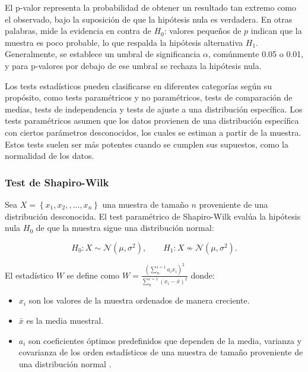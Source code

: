 El p-valor representa la probabilidad de obtener un resultado tan extremo como el observado, bajo la suposición de que la hipótesis nula es verdadera. En otras palabras, mide la evidencia en contra de $H_0$: valores pequeños de $p$ indican que la muestra es poco probable, lo que respalda la hipótesis alternativa $H_1$. Generalmente, se establece un umbral de significancia $\alpha$, comúnmente 0.05 o 0.01, y para p-valores por debajo de ese umbral se rechaza la hipótesis nula.

Los tests estadísticos pueden clasificarse en diferentes categorías según su propósito, como tests paramétricos y no paramétricos, tests de comparación de medias, tests de independencia y tests de ajuste a una distribución específica. Los tests paramétricos asumen que los datos provienen de una distribución específica con ciertos parámetros desconocidos, los cuales se estiman a partir de la muestra. Estos tests suelen ser más potentes cuando se cumplen sus supuestos, como la normalidad de los datos.

\subsubsection{Test de Shapiro-Wilk}

Sea $X= \left \{x_1, x_2,,\ldots,x_n \right \}$ una muestra de tamaño $n$ proveniente de una distribución desconocida. El test paramétrico de Shapiro-Wilk \cite{S-Wtest} evalúa la hipótesis nula $H_0$ de que la muestra sigue una distribución normal:

$$H_0: X \sim \mathcal{N}(\mu,\sigma^2), \qquad H_1: X \nsim \mathcal{N}(\mu,\sigma^2).$$

El estadístico $W$ se define como $W=\frac{\left( \sum_{n}^{i=1}a_ix_i \right) ^2}{\sum_{n}^{i=1} \left( x_i - \bar{x}  \right) ^2}$ donde:

\begin{itemize}

\item $x_i$ son los valores de la muestra ordenados de manera creciente.

\item $\bar{x}$ es la media muestral.

\item $a_i$ son coeficientes óptimos predefinidos que dependen de la media, varianza y covarianza de los orden estadísticos de una muestra de tamaño  proveniente de una distribución normal .

\end{itemize}


